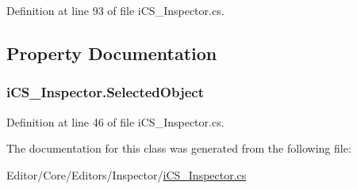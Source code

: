 Definition at line 93 of file i\+C\+S\+\_\+\+Inspector.\+cs.



\subsection{Property Documentation}
\hypertarget{classi_c_s___inspector_a19eb71dfa9b870a3e2332122f8bbf0e1}{
\subsubsection[{Selected\+Object}]{ i\+C\+S\+\_\+\+Inspector.\+Selected\+Object\hspace{0.3cm}{\ttfamily [get]}}}\label{classi_c_s___inspector_a19eb71dfa9b870a3e2332122f8bbf0e1}


Definition at line 46 of file i\+C\+S\+\_\+\+Inspector.\+cs.



The documentation for this class was generated from the following file\+:\begin{DoxyCompactItemize}
\item 
Editor/\+Core/\+Editors/\+Inspector/\hyperlink{i_c_s___inspector_8cs}{i\+C\+S\+\_\+\+Inspector.\+cs}\end{DoxyCompactItemize}
